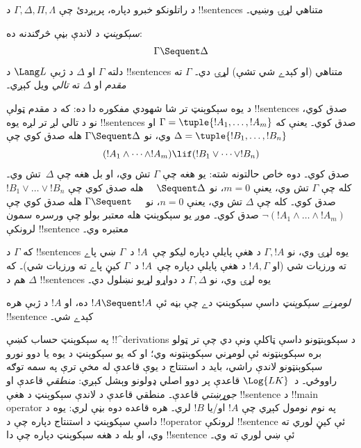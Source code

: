 \documentclass[../../../include/open-logic-section]{subfiles}
\begin{document}
      {}
      {}


د راتلونکو خبرو دپاره، پرېږدئ چې $\Gamma, \Delta, \Pi, \Lambda$ د
!!{sentence}s متناهي لړۍ وښيي۔

\begin{defn}[سېکوېنټ]
\emph{سېکوېنټ} د لاندې بڼې څرګندنه ده:
\[
\Gamma \Sequent \Delta
\]
دلته $\Gamma$ او $\Delta$ د ژبې $\Lang L$ د !!{sentence}s متناهي
(او کېدے شي تشې) لړۍ دي۔ $\Gamma$ ته \emph{مقدم} او $\Delta$ ته
\emph{تالي} ويل کېږي۔
\end{defn}

\begin{explain}
د يوه سېکوېنټ تر شا شهودي مفکوره دا ده: که د مقدم ټولې !!{sentence}s
صدق کوي، نو د تالي لږ تر لږه يوه !!{sentence}s صدق کوي۔ يعنې که
$\Gamma = \tuple{!A_1, \dots, !A_m}$ او
$\Delta = \tuple{!B_1, \dots, !B_n}$ وي، نو $\Gamma \Sequent \Delta$
هله صدق کوي چې
\[
(!A_1 \land \cdots \land !A_m) \lif (!B_1 \lor \cdots \lor
!B_n)
\]
صدق کوي۔ دوه خاص حالتونه شته: يو هغه چې $\Gamma$ تش وي، او بل هغه
چې $\Delta$~تش وي۔ کله چې $\Gamma$ تش وي، يعنې $m = 0$، نو $\quad
\Sequent \Delta$ هله صدق کوي چې $!B_1 \lor \dots \lor !B_n$ صدق
کوي۔ کله چې $\Delta$ تش وي، يعنې $n = 0$، نو $\Gamma \Sequent \quad$
هله صدق کوي چې $\lnot(!A_1 \land \dots \land !A_m)$ صدق کوي۔
موږ يو سېکوېنټ هله معتبر بولو چې ورسره سمون لرونکې !!{sentence}
معتبره وي۔
\end{explain}

که $\Gamma$ د !!{sentence}s يوه لړۍ وي، نو $\Gamma, !A$ د هغې
پايلې دپاره ليکو چې~$!A$ د~$\Gamma$ ښي پاے ته ورزيات شي (او $!A,
\Gamma$ د هغې پايلې دپاره چې~$!A$ د~$\Gamma$ کيڼ پاے ته ورزيات
شي)۔ که $\Delta$ هم د !!{sentence}s يوه لړۍ وي، نو $\Gamma,
\Delta$ د دواړو لړيو نښلول دي۔

\begin{defn}
\emph{لومړنے سېکوېنټ} داسې سېکوېنټ دے
{چې بڼه ئې $!A \Sequent !A$ ده}، او $!A$ د ژبې هره !!{sentence}
کېدے شي۔
\end{defn}

په سېکوېنټ حساب کښې !!^{derivation}s د سېکوېنټونو داسې ټاکلې ونې
دي چې تر ټولو بره سېکوېنټونه ئې لومړني سېکوېنټونه وي؛ او که يو
سېکوېنټ د يوه يا دوو نورو سېکوېنټونو لاندې راشي، بايد د استنتاج د
يوې قاعدې له مخې ترې په سمه توګه راووځي۔ د~$\Log{LK}$ قاعدې پر دوو
اصلي ډولونو وېشل کېږي: \emph{منطقي} قاعدې او \emph{جوړښتي} قاعدې۔
منطقي قاعدې د لاندې سېکوېنټ د هغې !!{sentence} د !!{main
  operator} په نوم نومول کېږي چې $!A$ او/يا $!B$ لري۔ هره قاعده
دوه بڼې لري: يوه د داسې سېکوېنټ د استنتاج دپاره چې د
!!{operator} لرونکې !!{sentence} ئې کيڼ لوري ته وي، او بله د هغه
سېکوېنټ دپاره چې دا !!{sentence} ئې ښي لوري ته وي۔
\end{document}
